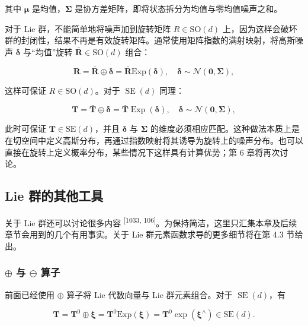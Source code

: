 其中 $\pmb\mu$ 是均值，$\pmb\Sigma$ 是协方差矩阵，即将状态拆分为均值与零均值噪声之和。

对于 Lie 群，不能简单地将噪声加到旋转矩阵 $R\in\mathrm{SO}(d)$ 上，因为这样会破坏群的封闭性，结果不再是有效旋转矩阵。通常使用矩阵指数的满射映射，将高斯噪声 $\pmb\delta$ 与“均值”旋转 $\bar{\pmb R}\in\mathrm{SO}(d)$ 组合：

\begin{equation}
\boldsymbol {R} = \bar {\boldsymbol {R}} \oplus \boldsymbol {\delta} = \bar {\boldsymbol {R}} \mathrm{Exp} (\boldsymbol {\delta}), \quad \boldsymbol {\delta} \sim \mathcal {N} (\boldsymbol {0}, \boldsymbol {\Sigma}),\tag{2.22}
\end{equation}

这样可保证 $R\in\mathrm{SO}(d)$。对于 $\operatorname{SE}(d)$ 同理：

\begin{equation}
\boldsymbol {T} = \bar {\boldsymbol {T}} \oplus \boldsymbol {\delta} = \bar {\boldsymbol {T}} \operatorname{Exp} (\boldsymbol {\delta}), \quad \boldsymbol {\delta} \sim \mathcal {N} (\boldsymbol {0}, \boldsymbol {\Sigma}),\tag{2.23}
\end{equation}

此时可保证 $\pmb T\in\mathrm{SE}(d)$，并且 $\pmb\delta$ 与 $\pmb\Sigma$ 的维度必须相应匹配。这种做法本质上是在切空间中定义高斯分布，再通过指数映射将其诱导为旋转上的噪声分布。也可以直接在旋转上定义概率分布，某些情况下这样具有计算优势；第 6 章将再次讨论。

\subsection{Lie 群的其他工具}

关于 Lie 群还可以讨论很多内容 \textsuperscript{[1033, 106]}。为保持简洁，这里只汇集本章及后续章节会用到的几个有用事实。关于 Lie 群元素函数求导的更多细节将在第 4.3 节给出。

\subsubsection{$\oplus$ 与 $\ominus$ 算子}

前面已经使用 $\oplus$ 算子将 Lie 代数向量与 Lie 群元素组合。对于 $\operatorname{SE}(d)$，有

\begin{equation}
\boldsymbol {T} = \boldsymbol {T} ^ {0} \oplus \boldsymbol {\xi} = \boldsymbol {T} ^ {0} \mathrm{Exp} (\boldsymbol {\xi}) = \boldsymbol {T} ^ {0} \exp (\boldsymbol {\xi} ^ {\wedge}) \in \mathrm{SE} (d).\tag{2.24}
\end{equation}

